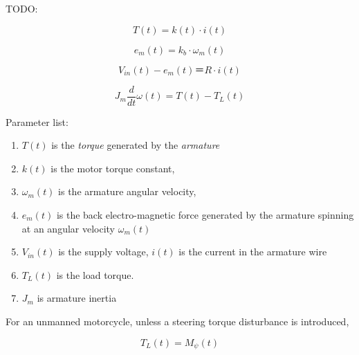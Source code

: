 \documentclass[11pt]{article}
\begin{document}
TODO:

\begin{equation}
    T(t) = k(t) \cdot i(t)
\end{equation}

\begin{equation}
    e_{m}(t) = k_{b} \cdot \omega_{m}(t)
\end{equation}

\begin{equation}
    V_{in}(t) - e_{m}(t) ＝ R \cdot i(t)
\end{equation}

\begin{equation}
    J_{m}\frac{d}{dt}\omega(t) = T(t) - T_{L}(t)
\end{equation}

Parameter list:
\begin{enumerate}
\item  $T(t)$ is the {\em torque} generated by the {\em armature}

\item $k(t)$ is the motor torque constant,
\item $\omega_{m}(t)$ is the armature angular velocity,
\item $e_{m}(t)$ is the back electro-magnetic force
generated by the armature spinning at an angular velocity $\omega_{m}(t)$
\item $V_{in}(t)$ is the supply voltage, $i(t)$ is the current in the armature wire
\item $T_{L}(t)$ is the load torque.
\item $J_{m}$ is armature inertia
\end{enumerate}


For an unmanned motorcycle, unless a steering torque disturbance is introduced,

\begin{equation}
    T_{L}(t) = M_{\psi}(t)
\end{equation}



\end{document}
